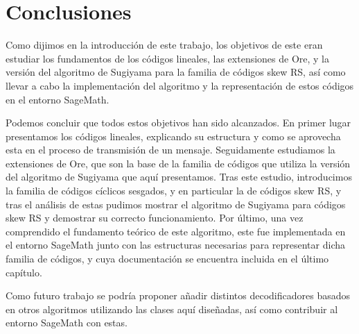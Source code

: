 \chapter*{Conclusiones}%
\label{chap:conclusiones}

Como dijimos en la introducción de este trabajo, los objetivos de este eran estudiar los fundamentos de los códigos lineales, las extensiones de Ore, y la versión del algoritmo de Sugiyama para la familia de códigos skew RS, así como llevar a cabo la implementación del algoritmo y la representación de estos códigos en el entorno SageMath.

Podemos concluir que todos estos objetivos han sido alcanzados. En primer lugar presentamos los códigos lineales, explicando su estructura y como se aprovecha esta en el proceso de transmisión de un mensaje. Seguidamente estudiamos la extensiones de Ore, que son la base de la familia de códigos que utiliza la versión del algoritmo de Sugiyama que aquí presentamos. Tras este estudio, introducimos la familia de códigos cíclicos sesgados, y en particular la de códigos skew RS, y tras el análisis de estas pudimos mostrar el algoritmo de Sugiyama para códigos skew RS y demostrar su correcto funcionamiento. Por último, una vez comprendido el fundamento teórico de este algoritmo, este fue implementada en el entorno SageMath junto con las estructuras necesarias para representar dicha familia de códigos, y cuya documentación se encuentra incluida en el último capítulo.

Como futuro trabajo se podría proponer añadir distintos decodificadores basados en otros algoritmos utilizando las clases aquí diseñadas, así como contribuir al entorno SageMath con estas.
